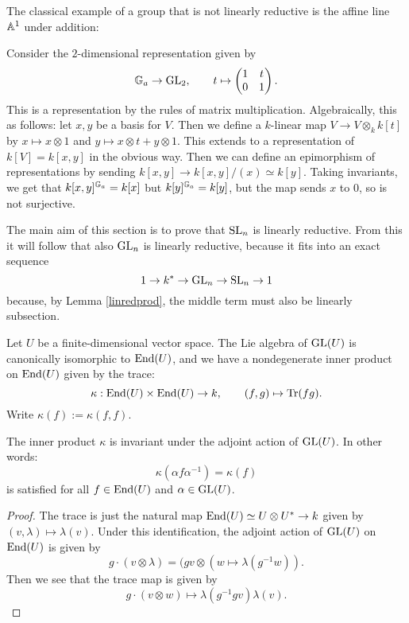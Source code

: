 \documentclass[11pt, english]{article}
\begin{document}
The classical example of a group that is not linearly reductive is the affine line $\mathbb{A}^1$ under addition:
\begin{example}
 Consider the $2$-dimensional representation given by
\[
\mathbb{G}_a \to \operatorname{GL}_2, \qquad t \mapsto \begin{pmatrix} 1 & t \\ 0 & 1 \end{pmatrix}.
\]
This is a representation by the rules of matrix multiplication. Algebraically, this as follows: let $x,y$ be a basis for $V$. Then we define a $k$-linear map $V \to V \otimes_k k[t]$ by $x \mapsto x \otimes 1$ and $y \mapsto x \otimes t + y \otimes 1$. This extends to a representation of $k[V]=k[x,y]$ in the obvious way. Then we can define an epimorphism of representations by sending $k[x,y] \to k[x,y]/(x) \simeq k[y]$. Taking invariants, we get that $k[x,y]^{\mathbb{G}_a} = k[x]$ but $k[y]^{\mathbb{G}_a}=k[y]$, but the map sends $x$ to $0$, so is not surjective.
\end{example}

The main aim of this section is to prove that $\operatorname{SL}_n$ is linearly reductive. From this it will follow that also $\operatorname{GL}_n$ is linearly reductive, because it fits into an exact sequence
$$
1 \to k^\ast \to \operatorname{GL}_n \to \operatorname{SL}_n \to 1
$$
because, by Lemma \ref{linredprod}, the middle term must also be linearly subsection.

Let $U$ be a finite-dimensional vector space. The Lie algebra of $\operatorname{GL}(U)$ is canonically isomorphic to $\operatorname{End}(U)$, and we have a nondegenerate inner product on $\operatorname{End}(U)$ given by the trace:
$$
\kappa:\operatorname{End}(U) \times \operatorname{End}(U) \to k, \qquad (f,g) \mapsto \operatorname{Tr}(fg).
$$
Write $\kappa(f) := \kappa(f,f)$.

\begin{lemma}
The inner product $\kappa$ is invariant under the adjoint action of $\operatorname{GL}(U)$. In other words:
\[
\kappa(\alpha f \alpha^{-1}) =  \kappa(f)
\]
is satisfied for all $f \in \operatorname{End}(U)$ and $\alpha \in \operatorname{GL}(U)$.
\end{lemma}
\begin{proof}
The trace is just the natural map $\operatorname{End}(U) \simeq U \otimes U^\ast \to k$ given by $(v,\lambda) \mapsto \lambda(v)$. Under this identification, the adjoint action of $\operatorname{GL}(U)$ on $\operatorname{End}(U)$ is given by $$g \cdot (v \otimes \lambda) = (gv \otimes (w \mapsto \lambda(g^{-1}w)).$$
Then we see that the trace map is given by
$$
g \cdot (v \otimes w) \mapsto \lambda(g^{-1}gv)\lambda(v).
$$
\end{proof}
\end{document}
